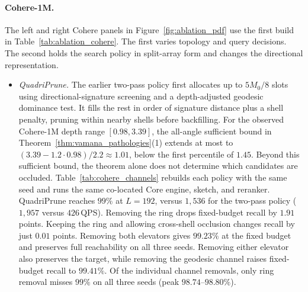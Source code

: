 \paragraph{Cohere-1M.}
The left and right Cohere panels in Figure~\ref{fig:ablation_pdf} use the first build in Table~\ref{tab:ablation_cohere}. The first varies topology and query decisions. The second holds the search policy in split-array form and changes the directional representation.
\begin{itemize}
  \item \emph{QuadriPrune.}
  The earlier two-pass policy first allocates up to $5M_0/8$ slots using directional-signature screening and a depth-adjusted geodesic dominance test. It fills the rest in order of signature distance plus a shell penalty, pruning within nearby shells before backfilling. For the observed {Cohere-1M} depth range $[0.98,3.39]$, the all-angle sufficient bound in Theorem~\ref{thm:vamana_pathologies}(1) extends at most to $(3.39-1.2\cdot0.98)/2.2\approx1.01$, below the first percentile of $1.45$. Beyond this sufficient bound, the theorem alone does not determine which candidates are occluded. Table~\ref{tab:cohere_channels} rebuilds each policy with the same seed and runs the same co-located Core engine, sketch, and reranker. QuadriPrune reaches $99\%$ at $L=192$, versus $1{,}536$ for the two-pass policy ($1{,}957$ versus $426$\,QPS). Removing the ring drops fixed-budget recall by $1.91$ points. Keeping the ring and allowing cross-shell occlusion changes recall by just $0.01$ points. Removing both elevators gives $99.23\%$ at the fixed budget and preserves full reachability on all three seeds. Removing either elevator also preserves the target, while removing the geodesic channel raises fixed-budget recall to $99.41\%$. Of the individual channel removals, only ring removal misses $99\%$ on all three seeds (peak $98.74$--$98.80\%$).


\end{itemize}
